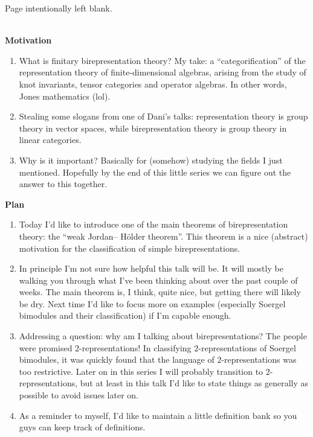\renewcommand\thesection{R}
\begingroup
\setlength{\emergencystretch}{.5em}
\printbibliography[heading=none]
\endgroup
\newpage

\vspace*{\fill}
\hfill Page intentionally left blank. \hfill
\vspace*{\fill}
\newpage

\noindent\\\textbf{Motivation}
\begin{enumerate}[label=$\bullet$, leftmargin=1\parindent]
\item What is finitary birepresentation theory? My take: a ``categorification'' of the representation theory of finite-dimensional algebras, arising from the study of knot invariants, tensor categories and operator algebras. In other words, Jones mathematics (lol).
\item Stealing some slogans from one of Dani's talks: representation theory is group theory in vector spaces, while birepresentation theory is group theory in linear categories.
\item Why is it important? Basically for (somehow) studying the fields I just mentioned. Hopefully by the end of this little series we can figure out the answer to this together.\\
\end{enumerate}

\noindent\textbf{Plan}
\begin{enumerate}[label=$\bullet$, leftmargin=1\parindent]
\item Today I'd like to introduce one of the main theorems of birepresentation theory: the ``weak Jordan-- H\"{o}lder theorem''. This theorem is a nice (abstract) motivation for the classification of simple birepresentations.
\item In principle I'm not sure how helpful this talk will be. It will mostly be walking you through what I've been thinking about over the past couple of weeks. The main theorem is, I think, quite nice, but getting there will likely be dry. Next time I'd like to focus more on examples (especially Soergel bimodules and their classification) if I'm capable enough.
\item Addressing a question: why am I talking about birepresentations? The people were promised $2$-representations! In classifying $2$-representations of Soergel bimodules, it was quickly found that the language of $2$-representations was too restrictive. Later on in this series I will probably transition to $2$-representations, but at least in this talk I'd like to state things as generally as possible to avoid issues later on.
\item As a reminder to myself, I'd like to maintain a little definition bank so you guys can keep track of definitions.\\
\end{enumerate}

